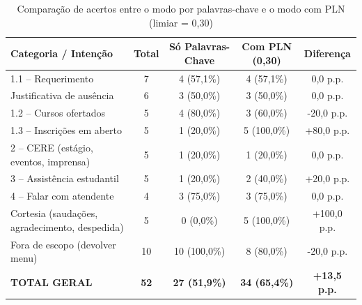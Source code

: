 \documentclass[10pt]{article}
\begin{document}
\begin{table}[H]
  \centering
  \begin{tabular}{|p{}|c|c|c|c|}
    \hline
    \textbf{Categoria / Intenção} & \textbf{Total} & \textbf{Só Palavras-Chave} & \textbf{Com PLN (0,30)} & \textbf{Diferença} \\ \hline
    1.1 -- Requerimento & 7 & 4 (57,1\%) & 4 (57,1\%) & 0,0 p.p. \\ \hline
    Justificativa de ausência & 6 & 3 (50,0\%) & 3 (50,0\%) & 0,0 p.p. \\ \hline
    1.2 -- Cursos ofertados & 5 & 4 (80,0\%) & 3 (60,0\%) & -20,0 p.p. \\ \hline
    1.3 -- Inscrições em aberto & 5 & 1 (20,0\%) & 5 (100,0\%) & +80,0 p.p. \\ \hline
    2 -- CERE (estágio, eventos, imprensa) & 5 & 1 (20,0\%) & 1 (20,0\%) & 0,0 p.p. \\ \hline
    3 -- Assistência estudantil & 5 & 1 (20,0\%) & 2 (40,0\%) & +20,0 p.p. \\ \hline
    4 -- Falar com atendente & 4 & 3 (75,0\%) & 3 (75,0\%) & 0,0 p.p. \\ \hline
    Cortesia (saudações, agradecimento, despedida) & 5 & 0 (0,0\%) & 5 (100,0\%) & +100,0 p.p. \\ \hline
    Fora de escopo (devolver menu) & 10 & 10 (100,0\%) & 8 (80,0\%) & -20,0 p.p. \\ \hline
    \textbf{TOTAL GERAL} & \textbf{52} & \textbf{27 (51,9\%)} & \textbf{34 (65,4\%)} & \textbf{+13,5 p.p.} \\ \hline
  \end{tabular}
  \caption{Comparação de acertos entre o modo por palavras-chave e o modo com PLN (limiar = 0,30)}
  \label{tab:comparacao_pln}
\end{table}
\end{document}
